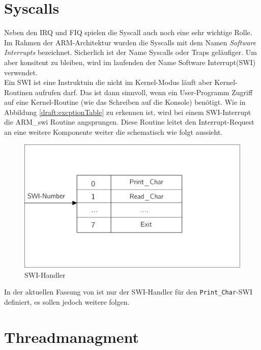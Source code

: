 \section{Syscalls}
Neben den IRQ und FIQ spielen die Syscall auch noch eine sehr wichtige Rolle. Im Rahmen der ARM-Architektur wurden die Syscalls mit dem Namen \textit{Software Interrupts} bezeichnet. Sicherlich ist der Name Syscalls oder Traps gel\"aufiger. Um aber konsitent zu bleiben, wird im laufenden der Name Software Interrupt(SWI) verwendet.\\
Ein SWI ist eine Instruktuin die nicht im Kernel-Modus l\"auft aber Kernel-Routinen aufrufen darf. Das ist dann sinnvoll, wenn ein User-Programm Zugriff auf eine Kernel-Routine (wie das Schreiben auf die Konsole) ben\"otigt. Wie in Abbildung \ref{draft:excptionTable} zu erkennen ist, wird bei einem SWI-Interrupt die ARM\_swi Routine angsprungen. Diese Routine leitet den Interrupt-Request an eine weitere Komponente weiter die schematisch wie folgt aussieht.
\begin{figure}[H]
	\begin{center}	
	\caption{SWI-Handler}
	\includegraphics[scale=0.60]{common/swihandler.pdf}
	\end{center}
\end{figure}
\noindent
In der aktuellen Fassung von \mops ist nur der SWI-Handler f\"ur den \texttt{Print\_Char}-SWI definiert, es sollen jedoch weitere folgen.
\section{Threadmanagment}
